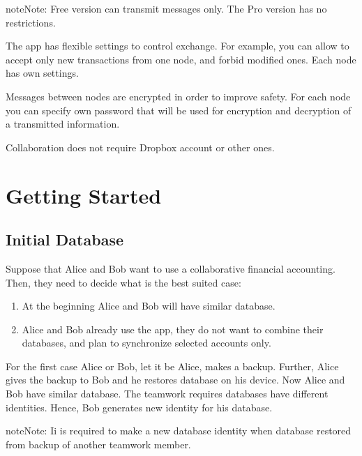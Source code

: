 \documentclass[a4paper,10pt,english]{sphinxmanual}
\begin{document}
\begin{sphinxadmonition}{note}{Note:}
\sphinxAtStartPar
Free version can transmit messages only. The Pro version has no restrictions.
\end{sphinxadmonition}

\sphinxAtStartPar
The app has flexible settings to control exchange. For example, you can allow to accept only new transactions
from one node, and forbid modified ones. Each node has own settings.

\sphinxAtStartPar
Messages between nodes are encrypted in order to improve safety. For each node you can specify
own password that will be used for encryption and decryption of a transmitted information.

\sphinxAtStartPar
Collaboration does not require Dropbox account or other ones.


\section{Getting Started}
\label{\detokenize{teamwork:getting-started}}

\subsection{Initial Database}
\label{\detokenize{teamwork:initial-database}}
\sphinxAtStartPar
Suppose that Alice and Bob want to use a collaborative financial accounting.
Then, they need to decide what is the best suited case:
\begin{enumerate}
%
\item {} 
\sphinxAtStartPar
At the beginning Alice and Bob will have similar database.

\item {} 
\sphinxAtStartPar
Alice and Bob already use the app, they do not want to combine their databases, and plan to synchronize selected accounts only.

\end{enumerate}

\sphinxAtStartPar
For the first case Alice or Bob, let it be Alice, makes a backup. Further, Alice gives the
backup to Bob and he restores database on his device. Now Alice and Bob have similar database.
The teamwork requires databases have different identities. Hence, Bob generates new identity
for his database.

\begin{sphinxadmonition}{note}{Note:}
\sphinxAtStartPar
Ii is required to make a new database identity when database restored from backup of another teamwork member.
\end{sphinxadmonition}
\end{document}
